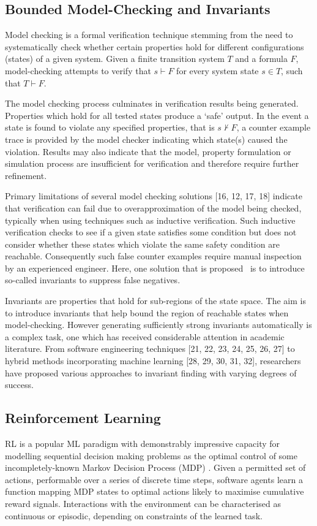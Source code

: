 \documentclass[runningheads]{llncs}
\begin{document}
\subsection{Bounded Model-Checking and Invariants}

Model checking is a formal verification technique stemming from the need to systematically
check whether certain properties hold for different configurations (states) of a given system.
Given a finite transition system $T$ and a formula $F$, model-checking attempts to verify
that $s \vdash F$ for every system state $s \in T$, such that $T \vdash F$. 

The model checking process culminates in verification results being generated. Properties which hold for all tested states
produce a ‘safe’ output. In the event a state is found to violate any specified properties, that 
is $s \nvdash F$, a counter example trace is provided by the model checker indicating which state(s)
caused the violation. Results may also indicate that the model, property formulation or
simulation process are insufficient for verification and therefore require further refinement.

Primary limitations of several model checking solutions [16, 12, 17, 18] indicate that verification can fail due to overapproximation of the model being checked, typically when using techniques such as inductive verification\cite{}. Such inductive verification checks to see if a given state satisfies
some condition but does not consider whether these states which violate
the same safety condition are reachable. Consequently such false counter examples require manual inspection by an
experienced engineer. Here, one solution that is proposed~\cite{1688959} is to introduce so-called invariants to suppress false negatives.

Invariants are properties that hold for sub-regions of the state space. The aim is to introduce invariants that help bound the region of reachable states when model-checking. However generating sufficiently strong invariants automatically is a complex task, one which has received considerable attention in academic
literature. From software engineering techniques [21, 22, 23, 24, 25, 26, 27] to hybrid methods incorporating machine learning [28, 29, 30, 31, 32], researchers have proposed various approaches to invariant finding with varying degrees of success.

\subsection{Reinforcement Learning}
RL is a popular ML paradigm with demonstrably impressive capacity for modelling sequential decision making problems as the optimal control of some incompletely-known Markov Decision Process (MDP)  \cite{sutton2018reinforcement}. Given a permitted set of actions, performable over a series of discrete time steps, software agents learn a function mapping MDP states to optimal actions likely to maximise cumulative reward signals. Interactions with the environment can be characterised as continuous or episodic, depending on constraints of the learned task.
 
\end{document}
